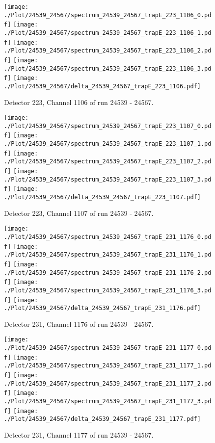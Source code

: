 \clearpage
\begin{figure}[hb]
\centering
\texttt{[image: ./Plot/24539\_24567/spectrum\_24539\_24567\_trapE\_223\_1106\_0.pdf]}
\texttt{[image: ./Plot/24539\_24567/spectrum\_24539\_24567\_trapE\_223\_1106\_1.pdf]}
\texttt{[image: ./Plot/24539\_24567/spectrum\_24539\_24567\_trapE\_223\_1106\_2.pdf]}
\texttt{[image: ./Plot/24539\_24567/spectrum\_24539\_24567\_trapE\_223\_1106\_3.pdf]}
\texttt{[image: ./Plot/24539\_24567/delta\_24539\_24567\_trapE\_223\_1106.pdf]}
\caption{ Detector 223, Channel 1106 of run 24539 - 24567.}
\label{fig:24539_24567_trapE_223_1106}
\end{figure}
\clearpage
\begin{figure}[hb]
\centering
\texttt{[image: ./Plot/24539\_24567/spectrum\_24539\_24567\_trapE\_223\_1107\_0.pdf]}
\texttt{[image: ./Plot/24539\_24567/spectrum\_24539\_24567\_trapE\_223\_1107\_1.pdf]}
\texttt{[image: ./Plot/24539\_24567/spectrum\_24539\_24567\_trapE\_223\_1107\_2.pdf]}
\texttt{[image: ./Plot/24539\_24567/spectrum\_24539\_24567\_trapE\_223\_1107\_3.pdf]}
\texttt{[image: ./Plot/24539\_24567/delta\_24539\_24567\_trapE\_223\_1107.pdf]}
\caption{ Detector 223, Channel 1107 of run 24539 - 24567.}
\label{fig:24539_24567_trapE_223_1107}
\end{figure}
\clearpage
\begin{figure}[hb]
\centering
\texttt{[image: ./Plot/24539\_24567/spectrum\_24539\_24567\_trapE\_231\_1176\_0.pdf]}
\texttt{[image: ./Plot/24539\_24567/spectrum\_24539\_24567\_trapE\_231\_1176\_1.pdf]}
\texttt{[image: ./Plot/24539\_24567/spectrum\_24539\_24567\_trapE\_231\_1176\_2.pdf]}
\texttt{[image: ./Plot/24539\_24567/spectrum\_24539\_24567\_trapE\_231\_1176\_3.pdf]}
\texttt{[image: ./Plot/24539\_24567/delta\_24539\_24567\_trapE\_231\_1176.pdf]}
\caption{ Detector 231, Channel 1176 of run 24539 - 24567.}
\label{fig:24539_24567_trapE_231_1176}
\end{figure}
\clearpage
\begin{figure}[hb]
\centering
\texttt{[image: ./Plot/24539\_24567/spectrum\_24539\_24567\_trapE\_231\_1177\_0.pdf]}
\texttt{[image: ./Plot/24539\_24567/spectrum\_24539\_24567\_trapE\_231\_1177\_1.pdf]}
\texttt{[image: ./Plot/24539\_24567/spectrum\_24539\_24567\_trapE\_231\_1177\_2.pdf]}
\texttt{[image: ./Plot/24539\_24567/spectrum\_24539\_24567\_trapE\_231\_1177\_3.pdf]}
\texttt{[image: ./Plot/24539\_24567/delta\_24539\_24567\_trapE\_231\_1177.pdf]}
\caption{ Detector 231, Channel 1177 of run 24539 - 24567.}
\label{fig:24539_24567_trapE_231_1177}
\end{figure}
